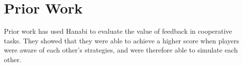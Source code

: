 \section{Prior Work}
\label{prior}

Prior work \cite{solvinghanabi} has used Hanabi to evaluate the value of feedback in cooperative tasks. They showed that they were able to achieve a higher score when players were aware of each other’s strategies, and were therefore able to simulate each other.
